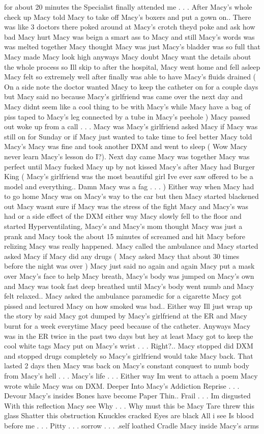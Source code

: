 \documentclass[12pt]{book}
\begin{document}
for about 20 minutes the Specialist finally attended me . . .  After Macy's whole check up Macy told Macy to take off Macy's boxers and put a gown on.. There was like 3 doctors there poked around at Macy's crotch theyd poke and ask how bad Macy hurt Macy was beign a smart ass to Macy and still Macy's words was was melted together Macy thought Macy was just Macy's bladder was so full that Macy made Macy look high anyways Macy doubt Macy want the details about the whole process so Ill skip to after the hospital, Macy went home and fell asleep Macy felt so extremely well after finally was able to have Macy's fluids drained ( On a side note the doctor wanted Macy to keep the catheter on for a couple days but Macy said no because Macy's girlfriend was came over the next day and Macy didnt seem like a cool thing to be with Macy's while Macy have a bag of piss taped to Macy's leg connected by a tube in Macy's peehole ) Macy passed out woke up from a call . . .  Macy was Macy's girlfriend asked Macy if Macy was still on for Sunday or if Macy just wanted to take time to feel better Macy told Macy's Macy was fine and took another DXM and went to sleep ( Wow Macy never learn Macy's lesson do I?). Next day came Macy was together Macy was perfect until Macy fucked Macy up by not kissed Macy's after Macy had Burger King ( Macy's girlfriend was the most beautiful girl Ive ever saw offered to be a model and everything.. Damn Macy was a fag . . .   ) Either way when Macy had to go home Macy was on Macy's way to the car but then Macy started blackened out Macy wasnt sure if Macy was the stress of the fight Macy and Macy's was had or a side effect of the DXM either way Macy slowly fell to the floor and started Hyperventilating, Macy's and Macy's mom thought Macy was just a prank and Macy took the about 15 minutes of screamed and hit Macy before relizing Macy was really happened. Macy called the ambulance and Macy started asked Macy if Macy did any drugs ( Macy asked Macy that about 30 times before the night was over ) Macy just said no again and again Macy put a mask over Macy's face to help Macy breath, Macy's body was jumped on Macy's own and Macy was took fast deep breathed until Macy's body went numb and Macy felt relaxed.. Macy asked the ambulance paramedic for a cigarette Macy got pissed and lectured Macy on how smoked was bad.. Either way Ill just wrap up the story by said Macy got dumped by Macy's girlfriend at the ER and Macy burnt for a week everytime Macy peed because of the catheter. Anyways Macy was in the ER twice in the past two days but hey at least Macy got to keep the cool white tags Macy put on Macy's wrist . . .  Right?.. Macy stopped did DXM and stopped drugs completely so Macy's girlfriend would take Macy back. That lasted 2 days then Macy was back on Macy's constant conquest to numb body from Macy's hell . . .  Macy's life . . .  Either way Im went to attach a poem Macy wrote while Macy was on DXM. Deeper Into Macy's Addiction Reprise . . .  Devour Macy's insides Bones have become Paper Thin.. Frail . . .  Im disgusted With this reflection Macy see Why . . .  Why must this be Macy Tare threw this glass Shatter this obstruction Knuckles cracked Eyes are black All i see Is blood before me . . .  Pitty . . .  sorrow . . .  .self loathed Cradle Macy inside Macy's arms 
\end{document}
